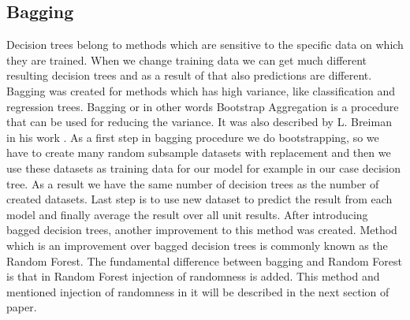 \subsection{Bagging}
Decision trees belong to methods which are sensitive to the specific data on which they are trained. When we change training data 
we can get much different resulting decision trees and as a result of that also predictions are different. 
Bagging was created for methods which has high variance, like classification and regression trees.
Bagging or in other words Bootstrap Aggregation is a procedure that can be used for reducing the variance.
It was also described by L. Breiman in his work \cite{breiman1996bagging}.
As a first step in bagging procedure we do bootstrapping, so we have to create many random subsample datasets with replacement
and then we use these datasets as training data for our model for example in our case decision tree. As a result we have the same number
of decision trees as the number of created datasets. Last step is to use new dataset to predict the result from each model and finally average the result 
over all unit results. After introducing bagged decision trees, another improvement to this method was created. Method which is an improvement over bagged decision trees 
is commonly known as the Random Forest. The fundamental difference between bagging and Random Forest is that in Random Forest injection of randomness is added. This method and mentioned injection of randomness in it will be described in the next section of paper.